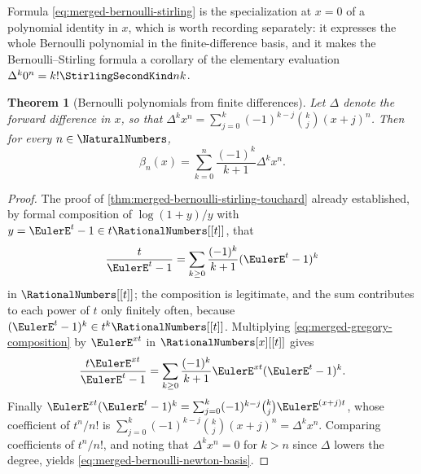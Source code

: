 \documentclass[11pt,a4paper,oneside,openany]{book}
\newtheorem{theorem}{Theorem}[chapter]
\theoremstyle{definition}
\theoremstyle{remark}
\begin{document}
Formula \eqref{eq:merged-bernoulli-stirling} is the specialization at $x=0$ of
a polynomial identity in $x$, which is worth recording separately: it expresses
the whole Bernoulli polynomial in the finite-difference basis, and it makes the
Bernoulli--Stirling formula a corollary of the elementary evaluation
$\Delta^k0^n=k!\StirlingSecondKind nk$.

\begin{theorem}[Bernoulli polynomials from finite differences]
\label{thm:merged-bernoulli-difference}
Let $\Delta$ denote the forward difference in $x$, so that
$\Delta^kx^n=\sum_{j=0}^k(-1)^{k-j}\binom kj(x+j)^n$.  Then for every
$n\in\NaturalNumbers$,
\begin{equation}
 \beta_n(x)=\sum_{k=0}^{n}\frac{(-1)^k}{k+1}\Delta^kx^n.           \label{eq:merged-bernoulli-newton-basis}
\end{equation}
\end{theorem}

\begin{proof}
The proof of \cref{thm:merged-bernoulli-stirling-touchard} already established,
by formal composition of $\log(1+y)/y$ with $y=\EulerE^t-1\in t\RationalNumbers[[t]]$,
that
\begin{equation}
 \frac{t}{\EulerE^t-1}=\sum_{k\geq0}\frac{(-1)^k}{k+1}(\EulerE^t-1)^k
                                                                  \label{eq:merged-gregory-composition}
\end{equation}
in $\RationalNumbers[[t]]$; the composition is legitimate, and the sum
contributes to each power of $t$ only finitely often, because
$(\EulerE^t-1)^k\in t^k\RationalNumbers[[t]]$.  Multiplying
\eqref{eq:merged-gregory-composition} by $\EulerE^{xt}$ in
$\RationalNumbers[x][[t]]$ gives
\[
 \frac{t\EulerE^{xt}}{\EulerE^t-1}
 =\sum_{k\geq0}\frac{(-1)^k}{k+1}\EulerE^{xt}(\EulerE^t-1)^k.
\]
Finally $\EulerE^{xt}(\EulerE^t-1)^k
=\sum_{j=0}^k(-1)^{k-j}\binom kj\EulerE^{(x+j)t}$, whose coefficient of
$t^n/n!$ is $\sum_{j=0}^k(-1)^{k-j}\binom kj(x+j)^n=\Delta^kx^n$.  Comparing
coefficients of $t^n/n!$, and noting that $\Delta^kx^n=0$ for $k>n$ since
$\Delta$ lowers the degree, yields \eqref{eq:merged-bernoulli-newton-basis}.
\end{proof}
\end{document}

